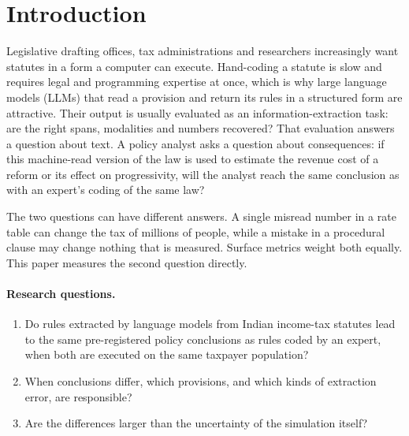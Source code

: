 \documentclass[sn-apa]{sn-jnl}
\begin{document}
\section{Introduction}\label{sec:intro}

Legislative drafting offices, tax administrations and researchers increasingly
want statutes in a form a computer can execute. Hand-coding a statute is slow
and requires legal and programming expertise at once, which is why large
language models (LLMs) that read a provision and return its rules in a
structured form are attractive. Their output is usually evaluated as an
information-extraction task: are the right spans, modalities and numbers
recovered? That evaluation answers a question about text. A policy analyst
asks a question about consequences: if this machine-read version of the law
is used to estimate the revenue cost of a reform or its effect on
progressivity, will the analyst reach the same conclusion as with an expert's
coding of the same law?

The two questions can have different answers. A single misread number in a
rate table can change the tax of millions of people, while a mistake in a
procedural clause may change nothing that is measured. Surface metrics weight
both equally. This paper measures the second question directly.

\paragraph{Research questions.}
\begin{enumerate}
  \item[RQ1] Do rules extracted by language models from Indian income-tax
  statutes lead to the same pre-registered policy conclusions as rules coded
  by an expert, when both are executed on the same taxpayer population?
  \item[RQ2] When conclusions differ, which provisions, and which kinds of
  extraction error, are responsible?
  \item[RQ3] Are the differences larger than the uncertainty of the
  simulation itself?
\end{enumerate}
\end{document}
